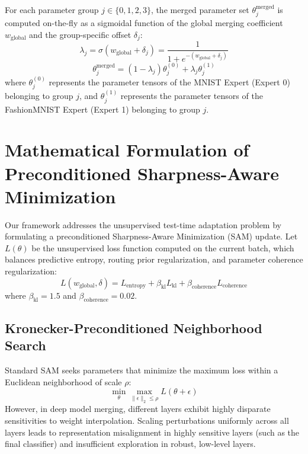 \documentclass{article}
\theoremstyle{plain}
\theoremstyle{definition}
\theoremstyle{remark}
\begin{document}
For each parameter group $j \in \{0, 1, 2, 3\}$, the merged parameter set $\theta_j^{\text{merged}}$ is computed on-the-fly as a sigmoidal function of the global merging coefficient $w_{\text{global}}$ and the group-specific offset $\delta_j$:
\begin{equation}
\lambda_j = \sigma(w_{\text{global}} + \delta_j) = \frac{1}{1 + e^{-(w_{\text{global}} + \delta_j)}}
\end{equation}
\begin{equation}
\theta_j^{\text{merged}} = (1 - \lambda_j) \theta_j^{(0)} + \lambda_j \theta_j^{(1)}
\end{equation}
where $\theta_j^{(0)}$ represents the parameter tensors of the MNIST Expert (Expert 0) belonging to group $j$, and $\theta_j^{(1)}$ represents the parameter tensors of the FashionMNIST Expert (Expert 1) belonging to group $j$.

\section{Mathematical Formulation of Preconditioned Sharpness-Aware Minimization}
\label{app:sam_formulation}

Our framework addresses the unsupervised test-time adaptation problem by formulating a preconditioned Sharpness-Aware Minimization (SAM) update. 
Let $L(\theta)$ be the unsupervised loss function computed on the current batch, which balances predictive entropy, routing prior regularization, and parameter coherence regularization:
\begin{equation}
L(w_{\text{global}}, \delta) = L_{\text{entropy}} + \beta_{\text{kl}} L_{\text{kl}} + \beta_{\text{coherence}} L_{\text{coherence}}
\end{equation}
where $\beta_{\text{kl}} = 1.5$ and $\beta_{\text{coherence}} = 0.02$.

\subsection{Kronecker-Preconditioned Neighborhood Search}
Standard SAM seeks parameters that minimize the maximum loss within a Euclidean neighborhood of scale $\rho$:
\begin{equation}
\min_{\theta} \max_{\|\epsilon\|_2 \le \rho} L(\theta + \epsilon)
\end{equation}
However, in deep model merging, different layers exhibit highly disparate sensitivities to weight interpolation. Scaling perturbations uniformly across all layers leads to representation misalignment in highly sensitive layers (such as the final classifier) and insufficient exploration in robust, low-level layers. 
\end{document}
